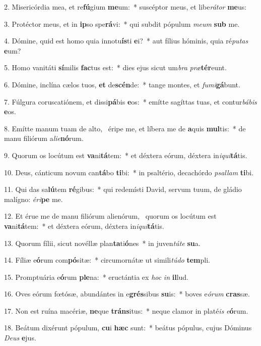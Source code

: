 2. Misericórdia mea, et re\textbf{fú}gium \textbf{me}um:~*  suscéptor meus, et libe\textit{rá}\textit{tor} \textbf{me}us:\

3. Protéctor meus, et in \textbf{ip}so spe\textbf{rá}vi:~*  qui subdit pópulum \textit{me}\textit{um} \textbf{sub} me.\

4. Dómine, quid est homo quia innotu\textbf{ís}ti \textbf{e}i?~*  aut fílius hóminis, quia ré\textit{pu}\textit{tas} \textbf{e}um?\

5. Homo vanitáti \textbf{sí}milis \textbf{fac}tus est:~*  dies ejus sicut um\textit{bra} \textit{præ}\textbf{tér}eunt.\

6. Dómine, inclína cælos tuos, \textbf{et} de\textbf{scén}de:~*  tange montes, et \textit{fu}\textit{mi}\textbf{gá}bunt.\

7. Fúlgura coruscatiónem, et dissi\textbf{pá}bis \textbf{e}os:~*  emítte sagíttas tuas, et contur\textit{bá}\textit{bis} \textbf{e}os.\

8. Emítte manum tuam de alto, \dag\  éripe me, et líbera me de \textbf{a}quis \textbf{mul}tis:~*  de manu filiórum a\textit{li}\textit{e}\textbf{nó}rum.\

9. Quorum os locútum est \textbf{va}ni\textbf{tá}tem:~*  et déxtera eórum, déxtera in\textit{i}\textit{qui}\textbf{tá}tis.\

10. Deus, cánticum novum can\textbf{tá}bo \textbf{ti}bi:~*  in psaltério, decachórdo \textit{psal}\textit{lam} \textbf{ti}bi.\

11. Qui das sa\textbf{lú}tem \textbf{ré}gibus:~*  qui redemísti David, servum tuum, de gládio malígno: \textit{é}\textit{ri}\textbf{pe} me.\

12. Et érue me de manu filiórum alienórum, \dag\  quorum os locútum est \textbf{va}ni\textbf{tá}tem:~*  et déxtera eórum, déxtera in\textit{i}\textit{qui}\textbf{tá}tis.\

13. Quorum fílii, sicut novéllæ plan\textbf{ta}ti\textbf{ó}nes~*  in juven\textit{tú}\textit{te} \textbf{su}a.\

14. Fíliæ e\textbf{ó}rum com\textbf{pó}sitæ:~*  circumornátæ ut simili\textit{tú}\textit{do} \textbf{tem}pli.\

15. Promptuária e\textbf{ó}rum \textbf{ple}na:~*  eructántia ex \textit{hoc} \textit{in} \textbf{il}lud.\

16. Oves eórum fœtósæ, abundántes in e\textbf{grés}sibus \textbf{su}is:~*  boves e\textit{ó}\textit{rum} \textbf{cras}sæ.\

17. Non est ruína macériæ, \textbf{ne}que \textbf{tráns}itus:~*  neque clamor in platé\textit{is} \textit{e}\textbf{ó}rum.\

18. Beátum dixérunt pópulum, \textbf{cu}i \textbf{hæc} sunt:~*  beátus pópulus, cujus Dóminus \textit{De}\textit{us} \textbf{e}jus.\

